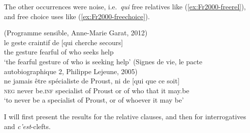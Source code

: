 The other occurrences were noise, i.e.\ \emph{qui} free relatives like (\ref{ex:Fr2000-freerel}), and free choice uses like (\ref{ex:Fr2000-freechoice}).

\eal
\ex (Programme sensible, Anne-Marie Garat, 2012)\\
\gll le geste craintif de [qui cherche secours]\\
the gesture fearful of who seeks help\\
\glt `the fearful gesture of who is seeking help'
\label{ex:Fr2000-freerel}
\ex (Signes de vie, le pacte autobiographique 2, Philippe Lejeune, 2005)\\
\gll ne jamais être spécialiste de Proust, ni de [qui que ce soit]\\
\textsc{neg} never be.\textsc{inf} specialist of Proust or of who that it may.be\\
\glt `to never be a specialist of Proust, or of whoever it may be'
\label{ex:Fr2000-freechoice}
\zl 

I will first present the results for the relative clauses, and then for interrogatives and \emph{c'est}-clefts.
